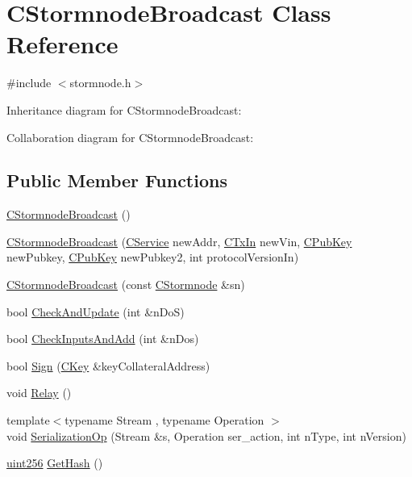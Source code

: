 \hypertarget{class_c_stormnode_broadcast}{}\section{C\+Stormnode\+Broadcast Class Reference}
\label{class_c_stormnode_broadcast}


{\ttfamily \#include $<$stormnode.\+h$>$}



Inheritance diagram for C\+Stormnode\+Broadcast\+:


Collaboration diagram for C\+Stormnode\+Broadcast\+:
\subsection*{Public Member Functions}
\begin{DoxyCompactItemize}
\item 
\hyperlink{class_c_stormnode_broadcast_a47810d94d4efad26911a2a3c0745660f}{C\+Stormnode\+Broadcast} ()
\item 
\hyperlink{class_c_stormnode_broadcast_a75374331e61dee9175968332d9cedc5c}{C\+Stormnode\+Broadcast} (\hyperlink{class_c_service}{C\+Service} new\+Addr, \hyperlink{class_c_tx_in}{C\+Tx\+In} new\+Vin, \hyperlink{class_c_pub_key}{C\+Pub\+Key} new\+Pubkey, \hyperlink{class_c_pub_key}{C\+Pub\+Key} new\+Pubkey2, int protocol\+Version\+In)
\item 
\hyperlink{class_c_stormnode_broadcast_a5f7014f4d8bd8b5a966921b55f50ef90}{C\+Stormnode\+Broadcast} (const \hyperlink{class_c_stormnode}{C\+Stormnode} \&sn)
\item 
bool \hyperlink{class_c_stormnode_broadcast_a1492e5bc8fc2587de913ec8ffc9d18a8}{Check\+And\+Update} (int \&n\+Do\+S)
\item 
bool \hyperlink{class_c_stormnode_broadcast_ac182349ba784e20ce826eda23a239e3c}{Check\+Inputs\+And\+Add} (int \&n\+Dos)
\item 
bool \hyperlink{class_c_stormnode_broadcast_a882ba76a946d67b53211c561b52fcb0b}{Sign} (\hyperlink{class_c_key}{C\+Key} \&key\+Collateral\+Address)
\item 
void \hyperlink{class_c_stormnode_broadcast_a6022d4cda8f1676aef30a3eaa2c512e5}{Relay} ()
\item 
{\footnotesize template$<$typename Stream , typename Operation $>$ }\\void \hyperlink{class_c_stormnode_broadcast_a5a56ebaf1e2e97ee84186e55440202b7}{Serialization\+Op} (Stream \&s, Operation ser\+\_\+action, int n\+Type, int n\+Version)
\item 
\hyperlink{classuint256}{uint256} \hyperlink{class_c_stormnode_broadcast_aec7747051b1004f1532817aba1da1a4c}{Get\+Hash} ()
\end{DoxyCompactItemize}
